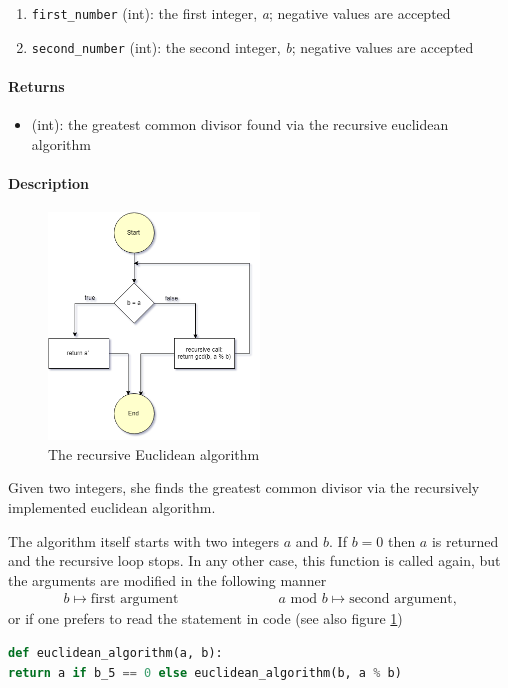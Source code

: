 \documentclass[refman]{scrartcl}
\newcommand{\mymod}{\text{\ \ mod\ \ }}
\begin{document}
\begin{enumerate}
  \item \texttt{first\_number} (int): the first integer, \textit{a}; negative values are accepted
  \item \texttt{second\_number} (int): the second integer, \textit{b}; negative values are accepted
\end{enumerate}

\paragraph*{Returns}

\begin{itemize}
  \item (int): the greatest common divisor found via the recursive euclidean algorithm
\end{itemize}

\paragraph*{Description}

\begin{figure}
	\centering
		\includegraphics[width=0.5\textwidth]{graphics/recursive_euclidean_algorithm}
	\caption{The recursive Euclidean algorithm}\label{fig:recursive}
  \end{figure}

Given two integers, she finds the greatest common divisor via the recursively implemented euclidean algorithm.

The algorithm itself starts with two integers \(a\) and \(b\). If \(b = 0\) then \(a\) is returned and the recursive loop stops. In any other case, this function is called again, but the arguments are modified in the following manner
%
\begin{align*}
	b \mapsto \text{first argument} \hspace{3cm} a \mymod b \mapsto \text{second argument} \text{,}
\end{align*}
%
or if one prefers to read the statement in code (see also figure \ref{fig:recursive})
%
\begin{lstlisting}[language=Python]
def euclidean_algorithm(a, b):
return a if b_5 == 0 else euclidean_algorithm(b, a % b)
\end{lstlisting}
\end{document}
